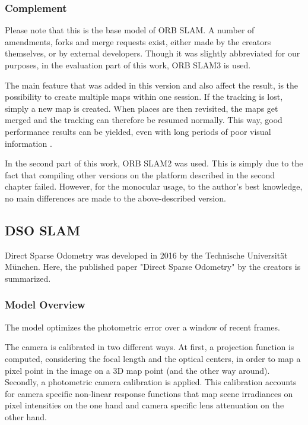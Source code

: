 	\subsubsection{Complement}\label{complement}
	
	Please note that this is the base model of ORB SLAM. A number of amendments, forks and merge requests exist, either made by the creators themselves, 
	or by external developers. Though it was slightly abbreviated for our purposes, in the evaluation part of this work, ORB SLAM3 is used. 
	
	The main feature that was added in this version and also affect the result, is the possibility to create multiple maps within one session. 
	If the tracking is lost, simply a new map is created. When places are then revisited, the maps get merged and the tracking can therefore 
	 be resumed normally.  This way, good performance results can be yielded, even with long periods of poor visual information \cite{orb3}. 
	
	In the second part of this work, ORB SLAM2 was used. This is simply due to the fact that compiling other versions on the platform described in the 
	second chapter failed. However, for the monocular usage, to the author's best knowledge, no main differences are made to the above-described version. 
	

	\subsection{DSO SLAM}\label{dsosecc}
	
	Direct Sparse Odometry was developed in 2016 by the Technische Universität München. Here, the published paper "Direct Sparse Odometry" \cite{dso} by the creators is summarized. 
	
	\subsubsection{Model Overview}\label{samemodel}
	
	The model optimizes the photometric error over a window of recent frames. 
	
	The camera is calibrated in two different ways. At first, a projection function is computed, considering the focal length and the optical centers, 
	in order to map a pixel point in the image on a 3D map point (and the other way around). Secondly, a photometric camera calibration is applied. 
	This calibration accounts for camera specific non-linear response functions that map scene irradiances on pixel intensities on the one hand and 
	camera specific lens attenuation on the other hand. 
	
